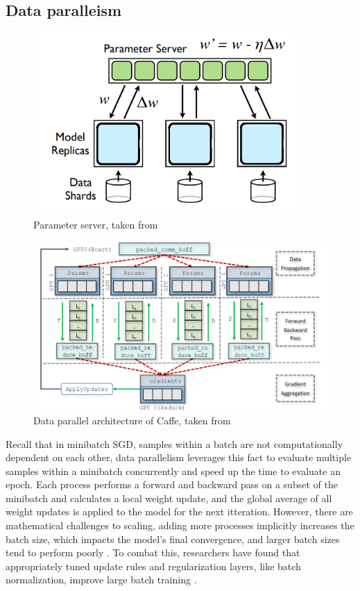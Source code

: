 \subsection{Data paralleism}
\begin{figure}
    \centering
    \includegraphics[width=10cm]{3_Chapters/3_Chapter_DistributedDL/Figs/parameter_server.png}
    \caption{Parameter server, taken from \cite{Dean2012DistBelif}}
    \label{fig:parameter-server}
\end{figure}

\begin{figure}
    \centering
    \includegraphics[width=15cm]{3_Chapters/3_Chapter_DistributedDL/Figs/Caffee_DP_arch.png}
    \caption{Data parallel architecture of Caffe, taken from \cite{Awan2017InDepthPerfCharOfDNN}}
    \label{fig:caffe-dp-arch}
\end{figure}


Recall that in minibatch SGD, samples within a batch are not computationally dependent on each other, data parallelism leverages this fact to evaluate multiple samples within a minibatch concurrently and speed up the time to evaluate an epoch. 
Each process performs a forward and backward pass on a subset of the minibatch and calculates a local weight update, and the global average of all weight updates is applied to the model for the next itteration.
However, there are mathematical challenges to scaling, adding more processes implicitly increases the batch size, which impacts the model's final convergence, and larger batch sizes tend to perform poorly \cite{Keskar2016LargeBatchTraining}.
To combat this, researchers have found that appropriately tuned update rules and regularization layers, like batch normalization, improve large batch training \cite{You2018ImgNetInMin, Goyal2017FacebookImgNet1Hour}. 

